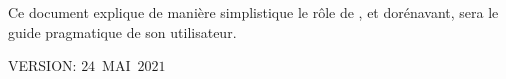 \begin{center}
\parbox{33em}{
\textcolor{purplish}{
Ce document explique de manière simplistique le r\^ole
de \yerothpgiblack, et dorénavant, sera le guide
pragmatique de son utilisateur.}
}

\vspace{3em}

\begin{center}
VERSION: $24$~MAI~$2021$
\end{center}


\end{center}

